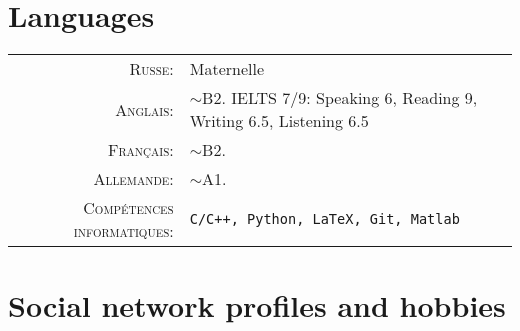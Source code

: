 \documentclass[a4paper,10pt]{article} %
\begin{document}
\vfill


\section{Languages}

\begin{tabular}{rl}
\textsc{Russe:} & Maternelle\\

\textsc{Anglais:} & $\sim$B2. IELTS 7/9: Speaking 6, Reading 9, Writing 6.5, Listening 6.5\\

\textsc{Français:} & $\sim$B2.\\

\textsc{Allemande:} & $\sim$A1.\\

\textsc{Compétences informatiques:} & \texttt{C/C++, Python, LaTeX, Git,
Matlab}
\\
\end{tabular}

\vfill

%
%
%


\iffalse
\section{Social network profiles and hobbies}
\end{document}
